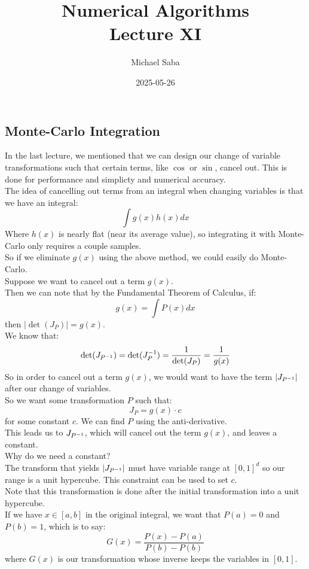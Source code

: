 \documentclass[12pt]{article}
\title{%
    \Huge Numerical Algorithms \\
    \Large Lecture XI
}
\date{2025-05-26}
\author{Michael Saba}
\begin{document}
\maketitle
\newpage
\setlength{\parindent}{0pt}

\subsection*{Monte-Carlo Integration}

In the last lecture, we mentioned that
we can design our change of variable transformations
such that certain terms, like $\cos$
or $\sin$, cancel out.
This is done for performance and simplicty
and numerical accuracy. \\

The idea of cancelling out terms from
an integral when changing variables
is that we have an integral:
\[ \int g(x)h(x) dx \]
Where $h(x)$ is nearly flat (near its average
value), so integrating it with Monte-Carlo
only requires a couple samples. \\
So if we eliminate $g(x)$ using the above method,
we could easily do Monte-Carlo. \\

Suppose we want to cancel out a term 
$g(x)$. \\
Then we can note that by the Fundamental
Theorem of Calculus, if:
\[ g(x) = \int P(x) dx \]
then $|\det(J_P)| = g(x)$. \\
We know that:
\[ \det(J_{P^{-1}}) =  \det(J_{P}^{-1})
= \dfrac{1}{\det(J_{P})}
= \dfrac{1}{g(x)} \]
So in order to cancel out a term $g(x)$,
we would want to have the term
$|J_{P^{-1}}|$ after our change of variables. \\

So we want some transformation $P$ such that:
\[ J_{P} = g(x) \cdot c \]
for some constant $c$. 
We can find $P$ using the anti-derivative. \\
This leads us to $J_{P^{-1}}$, which
will cancel out the term $g(x)$,
and leaves a constant. \\

Why do we need a constant? \\
The transform that yields $|J_{P^{-1}}|$
must have variable range at $[0, 1]^d$
so our range is a unit hypercube.
This constraint can be used to set $c$. \\
Note that this transformation is done 
after the initial transformation into a 
unit hypercube. \\
If we have $x \in [a, b]$ in the original
integral, we want that $P(a) = 0$
and $P(b) = 1$,
which is to say:
\[ G(x) = \dfrac{P(x) - P(a)}{P(b) - P(b)} \]
where $G(x)$ is our transformation
whose inverse keeps the variables 
in $[0, 1]$. \\
\end{document}
